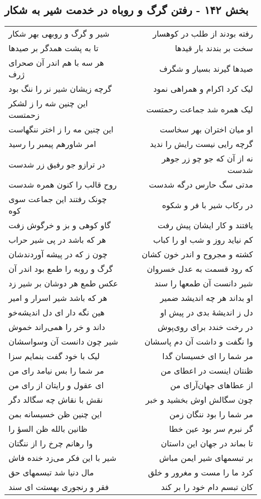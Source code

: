 \begin{center}
\section*{بخش ۱۴۲ - رفتن گرگ و روباه در خدمت شیر به شکار}
\label{sec:sh142}
\begin{longtable}{l p{0.5cm} r}
شیر و گرگ و روبهی بهر شکار
&&
رفته بودند از طلب در کوهسار
\\
تا به پشت همدگر بر صیدها
&&
سخت بر بندند بار قیدها
\\
هر سه با هم اندر آن صحرای ژرف
&&
صیدها گیرند بسیار و شگرف
\\
گرچه زیشان شیر نر را ننگ بود
&&
لیک کرد اکرام و همراهی نمود
\\
این چنین شه را ز لشکر زحمتست
&&
لیک همره شد جماعت رحمتست
\\
این چنین مه را ز اختر ننگهاست
&&
او میان اختران بهر سخاست
\\
امر شاورهم پیمبر را رسید
&&
گرچه رایی نیست رایش را ندید
\\
در ترازو جو رفیق زر شدست
&&
نه از آن که جو چو زر جوهر شدست
\\
روح قالب را کنون همره شدست
&&
مدتی سگ حارس درگه شدست
\\
چونک رفتند این جماعت سوی کوه
&&
در رکاب شیر با فر و شکوه
\\
گاو کوهی و بز و خرگوش زفت
&&
یافتند و کار ایشان پیش رفت
\\
هر که باشد در پی شیر حراب
&&
کم نیاید روز و شب او را کباب
\\
چون ز که در پیشه آوردندشان
&&
کشته و مجروح و اندر خون کشان
\\
گرگ و روبه را طمع بود اندر آن
&&
که رود قسمت به عدل خسروان
\\
عکس طمع هر دوشان بر شیر زد
&&
شیر دانست آن طمعها را سند
\\
هر که باشد شیر اسرار و امیر
&&
او بداند هر چه اندیشد ضمیر
\\
هین نگه دار ای دل اندیشه‌خو
&&
دل ز اندیشهٔ بدی در پیش او
\\
داند و خر را همی‌راند خموش
&&
در رخت خندد برای روی‌پوش
\\
شیر چون دانست آن وسواسشان
&&
وا نگفت و داشت آن دم پاسشان
\\
لیک با خود گفت بنمایم سزا
&&
مر شما را ای خسیسان گدا
\\
مر شما را بس نیامد رای من
&&
ظنتان اینست در اعطای من
\\
ای عقول و رایتان از رای من
&&
از عطاهای جهان‌آرای من
\\
نقش با نقاش چه سگالد دگر
&&
چون سگالش اوش بخشید و خبر
\\
این چنین ظن خسیسانه بمن
&&
مر شما را بود ننگان زمن
\\
ظانین بالله ظن السؤ را
&&
گر نبرم سر بود عین خطا
\\
وا رهانم چرخ را از ننگتان
&&
تا بماند در جهان این داستان
\\
شیر با این فکر می‌زد خنده فاش
&&
بر تبسمهای شیر ایمن مباش
\\
مال دنیا شد تبسمهای حق
&&
کرد ما را مست و مغرور و خلق
\\
فقر و رنجوری بهستت ای سند
&&
کان تبسم دام خود را بر کند
\\
\end{longtable}
\end{center}
